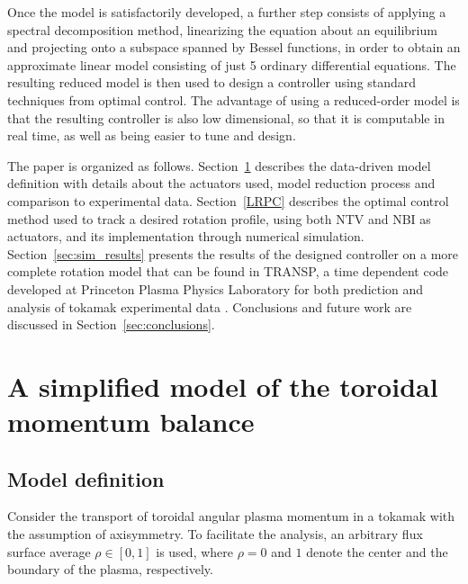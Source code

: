 \documentclass{iopart}
\begin{document}
Once the model is satisfactorily developed, a further step consists of applying
a spectral decomposition method, linearizing the equation about an equilibrium
and projecting onto a subspace spanned by Bessel functions, in order to obtain
an approximate linear model consisting of just 5 ordinary differential
equations.
%
The resulting reduced model is then used to design a controller using standard
techniques from optimal control.
%
The advantage of using a reduced-order model is that the resulting controller is
also low dimensional, so that it is computable in real time, as well as being
easier to tune and design.
 
The paper is organized as follows.  Section~\ref{MHW} describes the data-driven model
definition with details about the actuators used, model reduction process and
comparison to experimental data. Section~\ref{LRPC} describes the optimal
control method used to track a desired rotation profile, using both NTV and NBI
as actuators, and its implementation through numerical simulation. Section~\ref{sec:sim_results}
presents the results of the designed controller on a more complete rotation
model that can be found in TRANSP, a time dependent code developed at Princeton
Plasma Physics Laboratory for both prediction and analysis of tokamak
experimental data \cite{Goldston81, Budny94}. Conclusions and future work are
discussed in Section~\ref{sec:conclusions}.


 \section{A simplified model of  the toroidal momentum balance }
 \label{MHW}
 
\subsection{Model definition}
Consider the transport of toroidal angular plasma momentum in a tokamak with the assumption of axisymmetry.  To facilitate the analysis, an arbitrary flux surface average $\rho \in [0,1]$ is used, where $\rho = 0$ and $1$ denote the center and the boundary of the plasma, respectively.  
\end{document}
